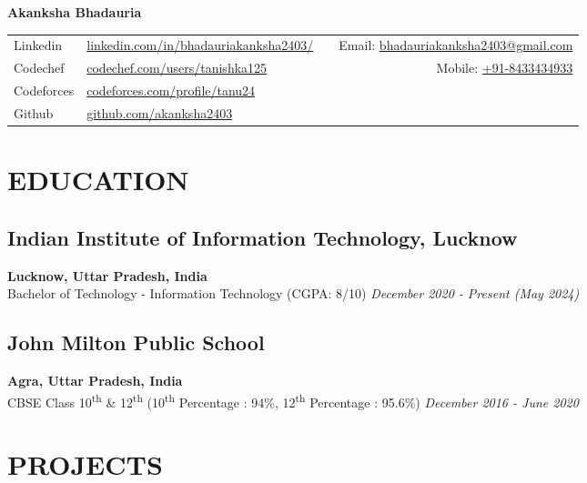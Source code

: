 \documentclass[12pt]{article}
\newcommand{\resumename}[1]{\LARGE\textbf{#1} \hfill \small}
\begin{document}
\noindent
\resumename{Akanksha Bhadauria} 
\begin{table}[h]
	\centering
	\begin{tabularx}{\textwidth}{@{}llXr}
		Linkedin & \href{https://www.linkedin.com/in/bhadauriakanksha2403/}{linkedin.com/in/bhadauriakanksha2403/} &   & Email: \href{mailto:bhadauriakanksha2403@gmail.com}{bhadauriakanksha2403@gmail.com} \\ 
		Codechef & \href{https://www.codechef.com/users/tanishka125}{codechef.com/users/tanishka125}               &   & Mobile: \href{tel:+918433434933}{+91-8433434933}                                    \\
		Codeforces &\href{https://codeforces.com/profile/tanu24}{codeforces.com/profile/tanu24} \\
		Github &\href{https://github.com/akanksha2403}{github.com/akanksha2403} \\
	\end{tabularx}
\end{table}
\vspace{-\topsep}
\section*{EDUCATION}
\subsection*{Indian Institute of Information Technology, Lucknow}      \hfill \textbf{Lucknow, Uttar Pradesh, India} \\
Bachelor of Technology - Information Technology (CGPA: 8/10) \hfill \textit{December 2020 - Present (May 2024)} \\
\subsection*{John Milton Public School}                       \hfill \textbf{Agra, Uttar Pradesh, India} \\
CBSE Class 10\textsuperscript{th} \& 12\textsuperscript{th} (10\textsuperscript{th} Percentage : 94\%, 12\textsuperscript{th} Percentage : 95.6\%) \hfill \textit{December 2016 - June 2020} \\ 

\section*{PROJECTS}
\end{document}
